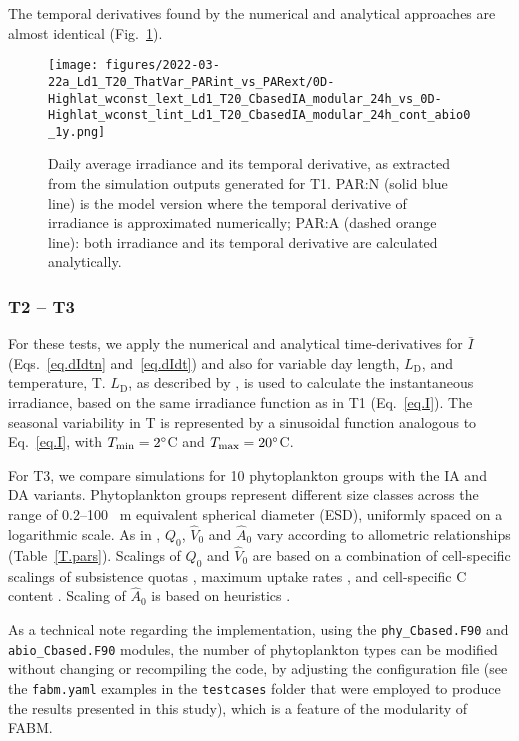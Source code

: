 \documentclass[gmd, manuscript]{copernicus}
\begin{document}
    The temporal derivatives found by the numerical and analytical approaches are almost identical (Fig.~\ref{f.T1light}).
    \begin{figure}[ht!]
    \texttt{[image: figures/2022-03-22a\_Ld1\_T20\_ThatVar\_PARint\_vs\_PARext/0D-Highlat\_wconst\_lext\_Ld1\_T20\_CbasedIA\_modular\_24h\_vs\_0D-Highlat\_wconst\_lint\_Ld1\_T20\_CbasedIA\_modular\_24h\_cont\_abio0\_1y.png]}
    \caption{Daily average irradiance and its temporal derivative, as extracted from the simulation outputs generated for T1. PAR:N (solid blue line) is the model version where the temporal derivative of irradiance is approximated numerically; PAR:A (dashed orange line): both irradiance and its temporal derivative are calculated analytically.\label{f.T1light}}
    \end{figure}

    \subsubsection{T2 -- T3}

    For these tests, we apply the numerical and analytical time-derivatives for $\bar{I}$ (Eqs.~\ref{eq.dIdtn} and~\ref{eq.dIdt}) and also for variable day length, $L_{\text{D}}$, and temperature, T\@. $L_{\text{D}}$, as described by \citet{Forsythe2003}, is used to calculate the instantaneous irradiance, based on the same irradiance function as in T1 (Eq.~\ref{eq.I}).  The seasonal variability in T is represented by a sinusoidal function analogous to Eq.~\ref{eq.I}, with $T_{\min}=2^{\circ}$C and $T_{\max}=20^{\circ}$C.

    For T3, we compare simulations for 10 phytoplankton groups with the IA and DA variants. Phytoplankton groups represent different size classes across the range of 0.2--100 \unit{{\mu}m} equivalent spherical diameter (ESD), uniformly spaced on a logarithmic scale. As in \citet{Smith2016}, $Q_0$, $\hat{V}_0$ and $\hat{A}_0$ vary according to allometric relationships (Table~\ref{T.pars}). Scalings of $Q_0$ and $\hat{V}_0$ are based on a combination of cell-specific scalings of subsistence quotas \citep[][`marine species']{Edwards2012}, maximum uptake rates \citep{Maranon2013}, and cell-specific C content \citep[][`protist plankton excluding diatoms']{Menden2000}. Scaling of $\hat{A}_0$ is based on heuristics \citep{Smith2014a}.

As a technical note regarding the implementation, using the \verb|phy_Cbased.F90| and \verb|abio_Cbased.F90| modules, the number of phytoplankton types can be modified without changing or recompiling the code, by adjusting the configuration file (see the \verb|fabm.yaml| examples in the \verb|testcases| folder that were employed to produce the results presented in this study), which is a feature of the modularity of FABM\@.
\end{document}

